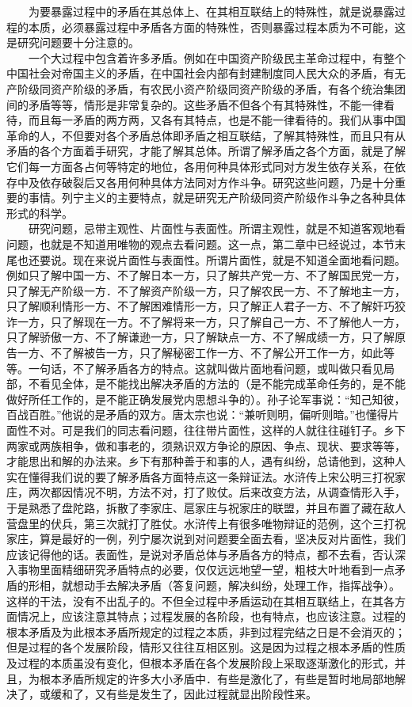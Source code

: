 \documentclass[cn,11pt,chinese]{elegantbook}
\begin{document}
　　为要暴露过程中的矛盾在其总体上、在其相互联结上的特殊性，就是说暴露过程的本质，必须暴露过程中矛盾各方面的特殊性，否则暴露过程本质为不可能，这是研究问题要十分注意的。\\
　　一个大过程中包含着许多矛盾。例如在中国资产阶级民主革命过程中，有整个中国社会对帝国主义的矛盾，在中国社会内部有封建制度同人民大众的矛盾，有无产阶级同资产阶级的矛盾，有农民小资产阶级同资产阶级的矛盾，有各个统治集团间的矛盾等等，情形是非常复杂的。这些矛盾不但各个有其特殊性，不能一律看待，而且每一矛盾的两方两，又各有其特点，也是不能一律看待的。我们从事中国革命的人，不但要对各个矛盾总体即矛盾之相互联结，了解其特殊性，而且只有从矛盾的各个方面着手研究，才能了解其总体。所谓了解矛盾之各个方面，就是了解它们每一方面各占何等特定的地位，各用何种具体形式同对方发生依存关系，在依存中及依存破裂后又各用何种具体方法同对方作斗争。研究这些问题，乃是十分重要的事情。列宁主义的主要特点，就是研究无产阶级同资产阶级作斗争之各种具体形式的科学。\\
　　研究问题，忌带主观性、片面性与表面性。所谓主观性，就是不知道客观地看问题，也就是不知道用唯物的观点去看问题。这一点，第二章中已经说过，本节末尾也还要说。现在来说片面性与表面性。所谓片面性，就是不知道全面地看问题。例如只了解中国一方、不了解日本一方，只了解共产党一方、不了解国民党一方，只了解无产阶级一方．不了解资产阶级一方，只了解农民一方、不了解地主一方，只了解顺利情形一方、不了解困难情形一方，只了解正人君子一方、不了解奸巧狡诈一方，只了解现在一方。不了解将来一方，只了解自己一方、不了解他人一方，只了解骄傲一方、不了解谦逊一方，只了解缺点一方、不了解成绩一方，只了解原告一方、不了解被告一方，只了解秘密工作一方、不了解公开工作一方，如此等等。一句话，不了解矛盾各方的特点。这就叫做片面地看问题，或叫做只看见局部，不看见全体，是不能找出解决矛盾的方法的（是不能完成革命任务的，是不能做好所任工作的，是不能正确发展党内思想斗争的）。孙子论军事说：“知己知彼，百战百胜。”他说的是矛盾的双方。唐太宗也说：“兼听则明，偏听则暗。”也懂得片面性不对。可是我们的同志看问题，往往带片面性，这样的人就往往碰钉子。乡下两家或两族相争，做和事老的，须熟识双方争论的原因、争点、现状、要求等等，才能思出和解的办法来。乡下有那种善于和事的人，遇有纠纷，总请他到，这种人实在懂得我们说的要了解矛盾各方面特点这一条辩证法。水浒传上宋公明三打祝家庄，两次都因情况不明，方法不对，打了败仗。后来改变方法，从调查情形入手，于是熟悉了盘陀路，拆散了李家庄、扈家庄与祝家庄的联盟，并且布置了藏在敌人营盘里的伏兵，第三次就打了胜仗。水浒传上有很多唯物辩证的范例，这个三打祝家庄，算是最好的一例，列宁屡次说到对问题要全面去看，坚决反对片面性，我们应该记得他的话。表面性，是说对矛盾总体与矛盾各方的特点，都不去看，否认深入事物里面精细研究矛盾特点的必要，仅仅远远地望一望，粗枝大叶地看到一点矛盾的形相，就想动手去解决矛盾（答复问题，解决纠纷，处理工作，指挥战争）。这样的干法，没有不出乱子的。不但全过程中矛盾运动在其相互联结上，在其各方面情况上，应该注意其特点；过程发展的各阶段，也有特点，也应该注意。过程的根本矛盾及为此根本矛盾所规定的过程之本质，非到过程完结之日是不会消灭的；但是过程的各个发展阶段，情形又往往互相区别。这是因为过程之根本矛盾的性质及过程的本质虽没有变化，但根本矛盾在各个发展阶段上采取逐渐激化的形式，并且，为根本矛盾所规定的许多大小矛盾中．有些是激化了，有些是暂时地局部地解决了，或缓和了，又有些是发生了，因此过程就显出阶段性来。\\
\end{document}
